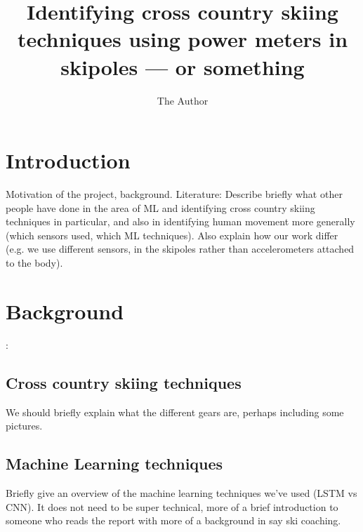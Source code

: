 \documentclass[11pt]{article}
\title{Identifying cross country skiing techniques using power meters in skipoles --- or something}
\author{The Author}
\begin{document}
\maketitle
{}


\section{Introduction}
Motivation of the project, background.
Literature: Describe briefly what other people have done in the area of ML and identifying cross country skiing techniques in particular, and also in identifying human movement more generally (which sensors used, which ML techniques). Also explain how our work differ (e.g. we use different sensors, in the skipoles rather than accelerometers attached to the body). 

\section{Background}:
\subsection{Cross country skiing techniques}
We should briefly explain what the different gears are, perhaps including some pictures.

\subsection{Machine Learning techniques}
Briefly give an overview of the machine learning techniques we've used (LSTM vs CNN). It does not need to be super technical, more of a brief introduction to someone who reads the report with more of a background in say ski coaching. 
\end{document}

